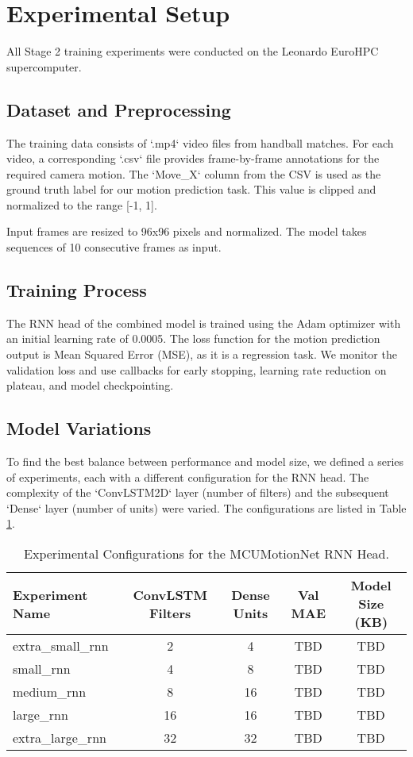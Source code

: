 \documentclass{article}
\begin{document}
\section{Experimental Setup}
All Stage 2 training experiments were conducted on the Leonardo EuroHPC supercomputer.

\subsection{Dataset and Preprocessing}
The training data consists of `.mp4` video files from handball matches. For each video, a corresponding `.csv` file provides frame-by-frame annotations for the required camera motion. The `Move_X` column from the CSV is used as the ground truth label for our motion prediction task. This value is clipped and normalized to the range [-1, 1].

Input frames are resized to 96x96 pixels and normalized. The model takes sequences of 10 consecutive frames as input.

\subsection{Training Process}
The RNN head of the combined model is trained using the Adam optimizer with an initial learning rate of 0.0005. The loss function for the motion prediction output is Mean Squared Error (MSE), as it is a regression task. We monitor the validation loss and use callbacks for early stopping, learning rate reduction on plateau, and model checkpointing.

\subsection{Model Variations}
To find the best balance between performance and model size, we defined a series of experiments, each with a different configuration for the RNN head. The complexity of the `ConvLSTM2D` layer (number of filters) and the subsequent `Dense` layer (number of units) were varied. The configurations are listed in Table \ref{tab:experiments}.

\begin{table}[h!]
\centering
\caption{Experimental Configurations for the MCUMotionNet RNN Head.}
\label{tab:experiments}
\begin{tabular}{|l|c|c|c|c|}
\hline
\textbf{Experiment Name} & \textbf{ConvLSTM Filters} & \textbf{Dense Units} & \textbf{Val MAE} & \textbf{Model Size (KB)} \\ \hline
extra\_small\_rnn & 2 & 4 & TBD & TBD \\
small\_rnn & 4 & 8 & TBD & TBD \\
medium\_rnn & 8 & 16 & TBD & TBD \\
large\_rnn & 16 & 16 & TBD & TBD \\
extra\_large\_rnn & 32 & 32 & TBD & TBD \\ \hline
\end{tabular}
\end{table}
\end{document}
